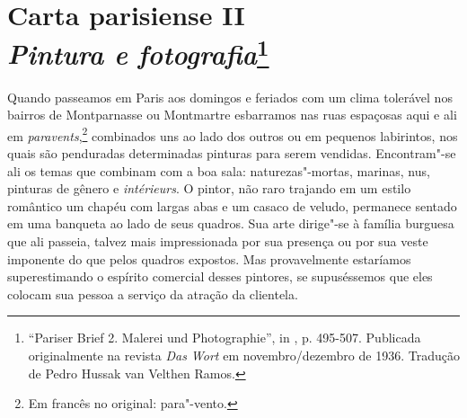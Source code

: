 \chapter{Carta parisiense II\\
\emph{Pintura e fotografia}\footnote[*]{``Pariser Brief 2. Malerei und Photographie'', in
  , p. 495-507. Publicada originalmente na revista \emph{Das Wort} em novembro/dezembro de 1936. Tradução de Pedro Hussak van Velthen Ramos.}}


Quando passeamos em Paris aos domingos e feriados com um clima tolerável
nos bairros de Montparnasse ou Montmartre esbarramos nas ruas espaçosas
aqui e ali em \emph{paravents},\footnote{Em francês no original:
 para"-vento. \versal{[N. T.]}} combinados uns ao lado dos outros ou em pequenos
labirintos, nos quais são penduradas determinadas pinturas para serem
vendidas. Encontram"-se ali os temas que combinam com a boa sala:
naturezas"-mortas, marinas, nus, pinturas de gênero e \emph{intérieurs}.
O pintor, não raro trajando em um estilo romântico um chapéu com largas abas e
um casaco de veludo, permanece sentado em uma banqueta ao lado de seus
quadros. Sua arte dirige"-se à família burguesa que ali passeia,
talvez mais impressionada por sua presença ou por sua veste
imponente do que pelos quadros expostos. Mas provavelmente estaríamos
superestimando o espírito comercial desses pintores, se supuséssemos que
eles colocam sua pessoa a serviço da atração da clientela.

